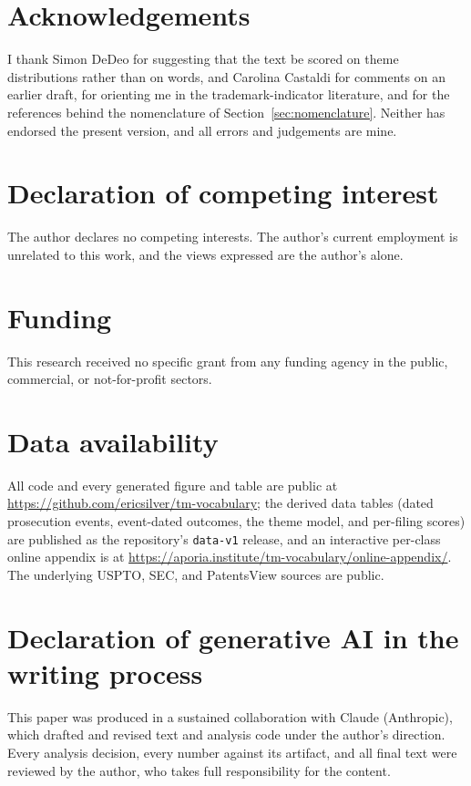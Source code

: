 \section*{Acknowledgements}
I thank Simon DeDeo for suggesting that the text be scored on theme
distributions rather than on words, and Carolina Castaldi for comments
on an earlier draft, for orienting me in the trademark-indicator
literature, and for the references behind the nomenclature of
Section~\ref{sec:nomenclature}. Neither has endorsed the present
version, and all errors and judgements are mine.

\section*{Declaration of competing interest}
The author declares no competing interests. The author's current
employment is unrelated to this work, and the views expressed are the
author's alone.

\section*{Funding}
This research received no specific grant from any funding agency in the
public, commercial, or not-for-profit sectors.

\section*{Data availability}
All code and every generated figure and table are public at
\url{https://github.com/ericsilver/tm-vocabulary}; the derived data tables
(dated prosecution events, event-dated outcomes, the theme model, and
per-filing scores) are published as the repository's \texttt{data-v1}
release, and an interactive per-class online appendix is at
\url{https://aporia.institute/tm-vocabulary/online-appendix/}. The
underlying USPTO, SEC, and PatentsView sources are public.

\section*{Declaration of generative AI in the writing process}
This paper was produced in a sustained collaboration with Claude
(Anthropic), which drafted and revised text and analysis code under the
author's direction. Every analysis decision, every number against its
artifact, and all final text were reviewed by the author, who takes full
responsibility for the content.

